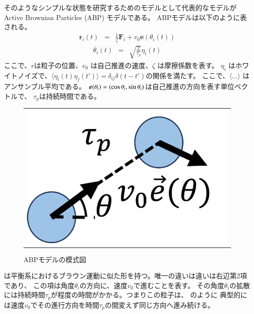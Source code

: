 \documentclass[/Users/ikedahajime/GitHub/reserch/master_report/thesis]{subfiles}
\begin{document}
そのようなシンプルな状態を研究するためのモデルとして代表的なモデルが Active Brownian Particles (ABP) モデルである。
ABPモデルは以下のように表される。
\begin{eqnarray}\label{eq:eom_abp_1}
    \dot{\bm{r}_i}(t)&=& \frac{1}{\zeta}\bm{F}_i + v_0 \bm{e}(\theta_i(t))
\end{eqnarray}
\begin{eqnarray}\label{eq:eom_abp_2}
    \dot{\theta_i }(t) &=& \sqrt{\frac{2}{\tau_p}}\eta_i(t)
\end{eqnarray}
ここで、\mbox{\boldmath$r$}は粒子の位置、$v_0$ は自己推進の速度、$\zeta$ は摩擦係数を表す。
$\eta_i$ はホワイトノイズで、$\langle \eta_i(t) \eta_j(t') \rangle=\delta_{ij}\delta(t-t')$の関係を満たす。
ここで、$\langle \dots \rangle$ はアンサンブル平均である。
$\mbox{\boldmath$e$}(\theta_i)=(\cos\theta_i,\sin \theta_i)$は自己推進の方向を表す単位ベクトルで、
$\tau_p$は持続時間である。
\begin{figure}
    \centering
    \begin{tabular}{c}
        \begin{minipage}{0.7\hsize}
            \includegraphics[width=\textwidth]{img/intro/fig_abp_model.png}
        \end{minipage}
    \end{tabular}
    \caption[Four sample images]
    {
        ABPモデルの模式図
    }
    \label{fig:intro_saple_abp}
\end{figure}
は平衡系におけるブラウン運動に似た形を持つ。唯一の違いは違いは右辺第2項であり、
この項は角度$\theta_i$の方向に、速度$v_0$で進むことを表す。
その角度$\theta_i$の拡散には持続時間$\tau_p$が程度の時間がかかる。つまりこの粒子は、
のように
典型的には速度$v_0$でその進行方向を時間$\tau_p$の間変えず同じ方向へ進み続ける。
\end{document}
